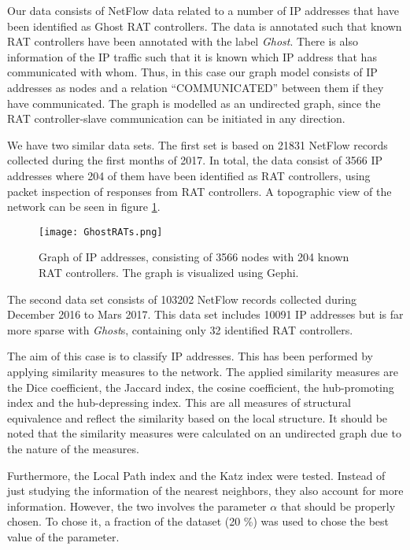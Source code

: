 Our data consists of NetFlow data related to a number of IP addresses that have been identified as Ghost RAT controllers. The data is annotated such that known RAT controllers have been annotated with the label \textit{Ghost}. There is also information of the IP traffic such that it is known which IP address that has communicated with whom. Thus, in this case our graph model consists of IP addresses as nodes and a relation ``COMMUNICATED'' between them if they have communicated. The graph is modelled as an undirected graph, since the RAT controller-slave communication can be initiated in any direction.

We have two similar data sets. The first set is based on 21831 NetFlow records collected during the first months of 2017. In total, the data consist of 3566 IP addresses where 204 of them have been identified as RAT controllers, using packet inspection of responses from RAT controllers. A topographic view of the network can be seen in figure \ref{ip1}.

\begin{figure}[h!]
    \centering
    \texttt{[image: GhostRATs.png]}
    \caption{Graph of IP addresses, consisting of 3566 nodes with 204 known RAT controllers. The graph is visualized using Gephi.}
    \label{ip1}
\end{figure}

The second data set consists of 103202 NetFlow records collected during December 2016 to Mars 2017. This data set includes 10091 IP addresses but is far more sparse with \textit{Ghost}s, containing only 32 identified RAT controllers. 

The aim of this case is to classify IP addresses. This has been performed by applying similarity measures to the network. The applied similarity measures are the Dice coefficient, the Jaccard index, the cosine coefficient, the hub-promoting index and the hub-depressing index. This are all measures of structural equivalence and reflect the similarity based on the local structure. It should be noted that the similarity measures were calculated on an undirected graph due to the nature of the measures. 

Furthermore, the Local Path index and the Katz index were tested. Instead of just studying the information of the nearest neighbors, they also account for more information. However, the two involves the parameter $\alpha$ that should be properly chosen. To chose it, a fraction of the dataset (20 \%) was used to chose the best value of the parameter. 

